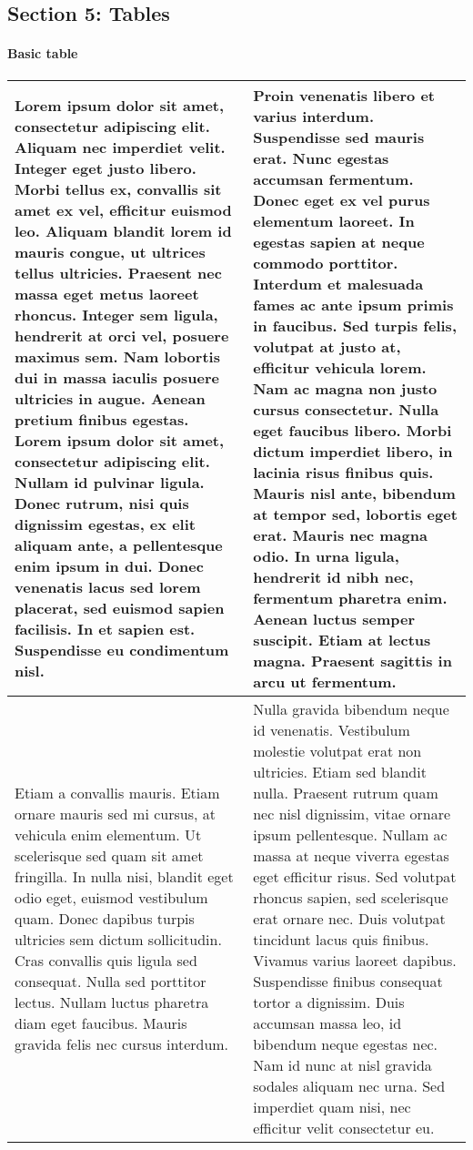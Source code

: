 \documentclass{article}
\begin{document}
\subsection*{Section 5: Tables}\paragraph{Basic table}
\begin{tabularx}{\textwidth}{|X|X|}
\hline

Lorem ipsum dolor sit amet, consectetur adipiscing elit. Aliquam nec imperdiet velit. Integer eget justo libero. Morbi tellus ex, convallis sit amet ex vel, efficitur euismod leo. Aliquam blandit lorem id mauris congue, ut ultrices tellus ultricies. Praesent nec massa eget metus laoreet rhoncus. Integer sem ligula, hendrerit at orci vel, posuere maximus sem. Nam lobortis dui in massa iaculis posuere ultricies in augue. Aenean pretium finibus egestas. Lorem ipsum dolor sit amet, consectetur adipiscing elit. Nullam id pulvinar ligula. Donec rutrum, nisi quis dignissim egestas, ex elit aliquam ante, a pellentesque enim ipsum in dui. Donec venenatis lacus sed lorem placerat, sed euismod sapien facilisis. In et sapien est. Suspendisse eu condimentum nisl.
 &
Proin venenatis libero et varius interdum. Suspendisse sed mauris erat. Nunc egestas accumsan fermentum. Donec eget ex vel purus elementum laoreet. In egestas sapien at neque commodo porttitor. Interdum et malesuada fames ac ante ipsum primis in faucibus. Sed turpis felis, volutpat at justo at, efficitur vehicula lorem. Nam ac magna non justo cursus consectetur. Nulla eget faucibus libero. Morbi dictum imperdiet libero, in lacinia risus finibus quis. Mauris nisl ante, bibendum at tempor sed, lobortis eget erat. Mauris nec magna odio. In urna ligula, hendrerit id nibh nec, fermentum pharetra enim. Aenean luctus semper suscipit. Etiam at lectus magna. Praesent sagittis in arcu ut fermentum.
 \\\hline
Etiam a convallis mauris. Etiam ornare mauris sed mi cursus, at vehicula enim elementum. Ut scelerisque sed quam sit amet fringilla. In nulla nisi, blandit eget odio eget, euismod vestibulum quam. Donec dapibus turpis ultricies sem dictum sollicitudin. Cras convallis quis ligula sed consequat. Nulla sed porttitor lectus. Nullam luctus pharetra diam eget faucibus. Mauris gravida felis nec cursus interdum.
 &
Nulla gravida bibendum neque id venenatis. Vestibulum molestie volutpat erat non ultricies. Etiam sed blandit nulla. Praesent rutrum quam nec nisl dignissim, vitae ornare ipsum pellentesque. Nullam ac massa at neque viverra egestas eget efficitur risus. Sed volutpat rhoncus sapien, sed scelerisque erat ornare nec. Duis volutpat tincidunt lacus quis finibus. Vivamus varius laoreet dapibus. Suspendisse finibus consequat tortor a dignissim. Duis accumsan massa leo, id bibendum neque egestas nec. Nam id nunc at nisl gravida sodales aliquam nec urna. Sed imperdiet quam nisi, nec efficitur velit consectetur eu.
 \\\hline
\end{tabularx}
\end{document}
